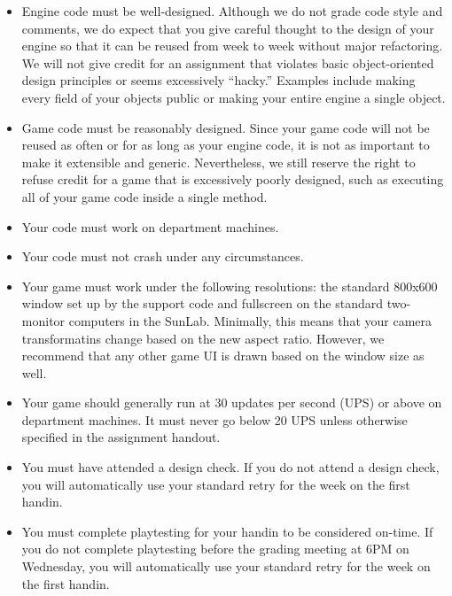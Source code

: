 \documentclass{cs1972}
\begin{document}
\begin{itemize}
  \item Engine code must be well-designed. Although we do not grade code style and comments, we do expect that you give careful thought to the design of your engine so that it can be reused from week to week without major refactoring. We will not give credit for an assignment that violates basic object-oriented design principles or seems excessively ``hacky.'' Examples include making every field of your objects public or making your entire engine a single object.
  \item Game code must be reasonably designed. Since your game code will not be reused as often or for as long as your engine code, it is not as important to make it extensible and generic. Nevertheless, we still reserve the right to refuse credit for a game that is excessively poorly designed, such as executing all of your game code inside a single method.
  \item Your code must work on department machines.
  \item Your code must not crash under any circumstances.
  \item Your game must work under the following resolutions: the standard 800x600 window set up by the support code and fullscreen on the standard two-monitor computers in the SunLab. Minimally, this means that your camera transformatins change based on the new aspect ratio. However, we recommend that any other game UI is drawn based on the window size as well.
  \item Your game should generally run at 30 updates per second (UPS) or above on department machines. It must never go below 20 UPS unless otherwise specified in the assignment handout.
  \item You must have attended a design check. If you do not attend a design check, you will automatically use your standard retry for the week on the first handin.
  \item You must complete playtesting for your handin to be considered on-time. If you do not complete playtesting before the grading meeting at 6PM on Wednesday, you will automatically use your standard retry for the week on the first handin.
 \end{itemize}
 
\end{document}
